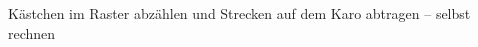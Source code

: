 \begin{aufgabe}{Kästchen im Raster abzählen und Strecken auf dem Karo abtragen – selbst rechnen}
\end{aufgabe}
